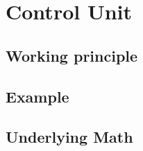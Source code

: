 \section{Control Unit} \label{sec:control_unit}
\subsection{Working principle} \label{sec:control_unit:working_principle}

\subsection{Example} \label{sec:control_unit:example}

\subsection{Underlying Math} \label{sec:control_unit:math}